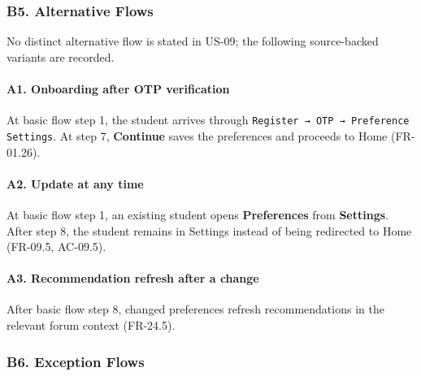 \documentclass[12pt]{article}
\begin{document}
\hypertarget{sec:b5-alternative-flows}{}
\subsubsection*{B5. Alternative Flows}
\par\medskip

No distinct alternative flow is stated in US-09; the following source-backed variants are recorded.
\par\medskip

\hypertarget{sec:a1-onboarding-after-otp-verification}{}
\paragraph*{A1. Onboarding after OTP verification}
\par\medskip

At basic flow step 1, the student arrives through \texttt{Register → OTP → Preference Settings}. At step 7, \textbf{Continue} saves the preferences and proceeds to Home (FR-01.26).
\par\medskip

\hypertarget{sec:a2-update-at-any-time}{}
\paragraph*{A2. Update at any time}
\par\medskip

At basic flow step 1, an existing student opens \textbf{Preferences} from \textbf{Settings}. After step 8, the student remains in Settings instead of being redirected to Home (FR-09.5, AC-09.5).
\par\medskip

\hypertarget{sec:a3-recommendation-refresh-after-a-change}{}
\paragraph*{A3. Recommendation refresh after a change}
\par\medskip

After basic flow step 8, changed preferences refresh recommendations in the relevant forum context (FR-24.5).
\par\medskip

\hypertarget{sec:b6-exception-flows}{}
\subsubsection*{B6. Exception Flows}
\par\medskip
\end{document}
